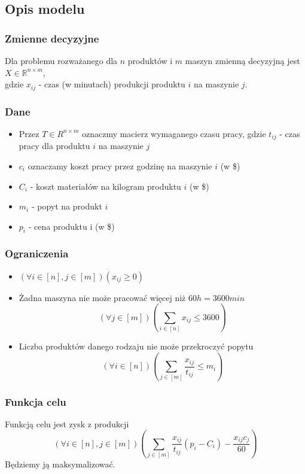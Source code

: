 \documentclass{article}
\begin{document}
\subsection{Opis modelu}
\subsubsection{Zmienne decyzyjne}
Dla problemu rozważanego dla \(n\) produktów i \(m\) maszyn zmienną decyzyjną jest \(X\in\mathbb{R}^{n \times m}\), \\
gdzie \(x_{ij}\) - czas (w minutach) produkcji produktu \(i\) na maszynie \(j\).

\subsubsection{Dane}
\begin{itemize}
    \item Przez \(T\in {R}^{n\times m}\) oznaczmy macierz wymaganego czasu pracy, gdzie \(t_{ij}\) - czas pracy dla produktu \(i\) na maszynie \(j\)
    \item \(c_i\) oznaczamy koszt pracy przez godzinę na maszynie \(i\) (w \$)
    \item \(C_i\) - koszt materiałów na kilogram produktu \(i\) (w \$)
    \item \(m_i\) - popyt na produkt \(i\)
    \item \(p_i\) - cena produktu i (w \$)
\end{itemize}

\subsubsection{Ograniczenia}
\begin{itemize}
    \item \((\forall i\in [n], j\in[m])(x_{ij} \geq 0)\)
    \item Żadna maszyna nie może pracować więcej niż \(60h = 3600min\)
    \[(\forall j\in [m])(\sum_{i\in[n]}x_{ij} \leq 3600)\]
    \item Liczba produktów danego rodzaju nie może przekroczyć popytu
    \[(\forall i\in [n])(\sum_{j\in[m]}\frac{x_{ij}}{t_{ij}} \leq m_i)\]
\end{itemize}

\subsubsection{Funkcja celu}
Funkcją celu jest zysk z produkcji
\[(\forall i\in [n], j\in[m]) (\sum_{j\in[m]}\frac{x_{ij}}{t_{ij}} (p_i - C_i) - \frac{x_{ij}c_j}{60}) \]
Będziemy ją maksymalizować.
\end{document}
